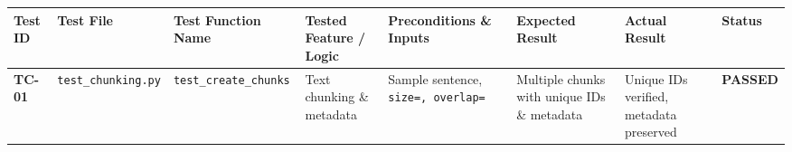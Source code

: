 \documentclass[
]{article}
\begin{document}
\begin{landscape}
\begingroup\scriptsize
\begin{longtable}[]{@{}
  >{\raggedright\arraybackslash\sloppy}p{}
  >{\raggedright\arraybackslash\sloppy}p{}
  >{\raggedright\arraybackslash\sloppy}p{}
  >{\raggedright\arraybackslash\sloppy}p{}
  >{\raggedright\arraybackslash\sloppy}p{}
  >{\raggedright\arraybackslash\sloppy}p{}
  >{\raggedright\arraybackslash\sloppy}p{}
  >{\raggedright\arraybackslash\sloppy}p{}@{}}
\toprule\noalign{}
\begin{minipage}[b]{\linewidth}\raggedright
Test ID
\end{minipage} & \begin{minipage}[b]{\linewidth}\raggedright
Test File
\end{minipage} & \begin{minipage}[b]{\linewidth}\raggedright
Test Function Name
\end{minipage} & \begin{minipage}[b]{\linewidth}\raggedright
Tested Feature / Logic
\end{minipage} & \begin{minipage}[b]{\linewidth}\raggedright
Preconditions \& Inputs
\end{minipage} & \begin{minipage}[b]{\linewidth}\raggedright
Expected Result
\end{minipage} & \begin{minipage}[b]{\linewidth}\raggedright
Actual Result
\end{minipage} & \begin{minipage}[b]{\linewidth}\raggedright
Status
\end{minipage} \\
\midrule\noalign{}
\endhead
\bottomrule\noalign{}
\endlastfoot
\textbf{TC-01} & \texttt{test\_\allowbreak chunking.\allowbreak py} &
\texttt{test\_\allowbreak create\_\allowbreak chunks} & Text chunking \& metadata & Sample
sentence, \texttt{size=\allowbreak 20,\allowbreak \ \allowbreak overlap=\allowbreak 5} & Multiple chunks with unique IDs
\& metadata & Unique IDs verified, metadata preserved &
\textbf{PASSED} \\

\end{longtable}
\end{landscape}
\end{document}

